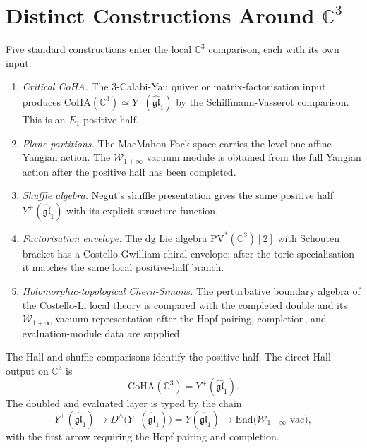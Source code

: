 \documentclass[11pt]{amsart}
\theoremstyle{definition}
\theoremstyle{remark}
\newcommand{\C}{\mathbb{C}}
\newcommand{\fgl}{\mathfrak{gl}}
\newcommand{\PV}{\mathrm{PV}}
\newcommand{\CoHA}{\mathrm{CoHA}}
\newcommand{\cW}{\mathcal{W}}
\begin{document}
\section{Distinct Constructions Around \texorpdfstring{$\C^3$}{C3}}
\label{sec:routes-c3}

Five standard constructions enter the local $\C^3$ comparison, each
with its own input.
\begin{enumerate}[label=\textup{(R\arabic*)}]
\item \emph{Critical CoHA.}  The $3$-Calabi-Yau quiver or
matrix-factorisation input produces
$\CoHA(\C^3)\simeq Y^+(\widehat{\fgl}_1)$ by the
Schiffmann-Vasserot comparison.  This is an $E_1$ positive half.
\item \emph{Plane partitions.}  The MacMahon Fock space carries the
level-one affine-Yangian action.  The $\cW_{1+\infty}$ vacuum module is
obtained from the full Yangian action after the positive half has been
completed.
\item \emph{Shuffle algebra.}  Negut's shuffle presentation gives the
same positive half $Y^+(\widehat{\fgl}_1)$ with its explicit structure
function.
\item \emph{Factorisation envelope.}  The dg Lie algebra
$\PV^\ast(\C^3)[2]$ with Schouten bracket has a
Costello-Gwilliam chiral envelope; after the toric specialisation it
matches the same local positive-half branch.
\item \emph{Holomorphic-topological Chern-Simons.}  The perturbative
boundary algebra of the Costello-Li local theory is compared with the
completed double and its $\cW_{1+\infty}$ vacuum representation after
the Hopf pairing, completion, and evaluation-module data are supplied.
\end{enumerate}

The Hall and shuffle comparisons identify the positive half.  The direct
Hall output on $\C^3$ is
\[
  \CoHA(\C^3)=Y^+(\widehat{\fgl}_1).
\]
The doubled and evaluated layer is typed by the chain
\[
  Y^+(\widehat{\fgl}_1)
  \longrightarrow
  D^\wedge\!\bigl(Y^+(\widehat{\fgl}_1)\bigr)
  =
  Y(\widehat{\fgl}_1)
  \longrightarrow
  \mathrm{End}\bigl(\cW_{1+\infty}\text{-}\mathrm{vac}\bigr),
\]
with the first arrow requiring the Hopf pairing and completion.
\end{document}
